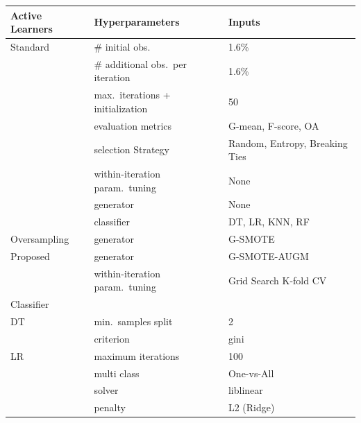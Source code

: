 \documentclass[parskip=full]{scrartcl}
\begin{document}
\begin{table}[H]
	\centering
	\begin{tabular}{lll}
		\toprule
		Active Learners & Hyperparameters                   & Inputs                         \\
		\midrule
		Standard        & \# initial obs.\                  & 1.6\%                          \\
                        & \# additional obs.\ per iteration & 1.6\%                          \\
                        & max.\ iterations + initialization & 50                             \\
                        & evaluation metrics                & G-mean, F-score, OA            \\
                        & selection Strategy                & Random, Entropy, Breaking Ties \\
                        & within-iteration param.\ tuning   & None                           \\
                        & generator                         & None                           \\
                        & classifier                        & DT, LR, KNN, RF                \\
        Oversampling    & generator                         & G-SMOTE                        \\
        Proposed        & generator                         & G-SMOTE-AUGM                   \\
                        & within-iteration param.\ tuning   & Grid Search K-fold CV          \\
		\toprule
		Classifier      &                                  &                                \\
		\midrule
        DT              & min.\ samples split              & 2                              \\
                        & criterion                        & gini                           \\
		LR              & maximum iterations               & 100                            \\
                        & multi class                      & One-vs-All                     \\
		                & solver                           & liblinear                      \\
                        & penalty                          & L2 (Ridge)                     \\

\end{tabular}
\end{table}
\end{document}
